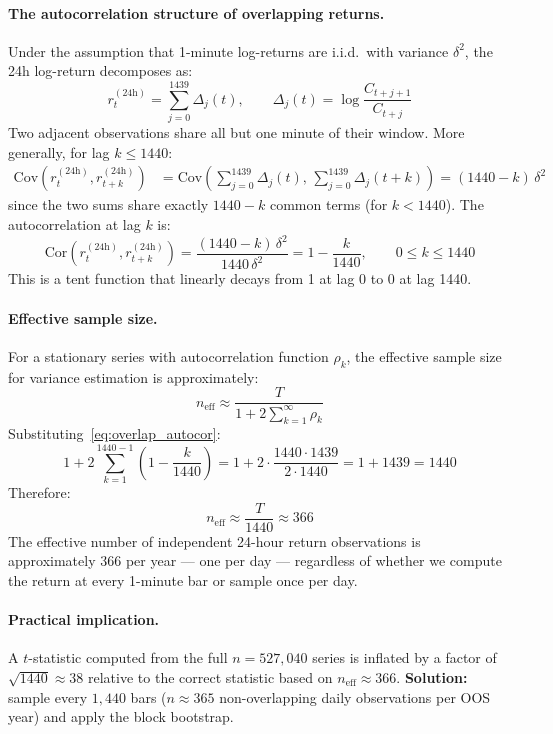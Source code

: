 \documentclass[12pt, a4paper]{article}
\theoremstyle{plain}
\theoremstyle{definition}
\newcommand{\Cov}{\mathrm{Cov}}
\newcommand{\Cor}{\mathrm{Cor}}
\begin{document}
\paragraph{The autocorrelation structure of overlapping returns.}
Under the assumption that 1-minute log-returns are i.i.d.\ with
variance $\delta^2$, the 24h log-return decomposes as:
\[
  r_t^{(24\text{h})} = \sum_{j=0}^{1439} \Delta_j(t),
  \qquad \Delta_j(t) = \log\frac{C_{t+j+1}}{C_{t+j}}
\]
Two adjacent observations share all but one minute of their window.
More generally, for lag $k \leq 1440$:
\begin{align*}
  \Cov\!\left(r_t^{(24\text{h})}, r_{t+k}^{(24\text{h})}\right)
  &= \Cov\!\left(\sum_{j=0}^{1439}\Delta_j(t),\,
                 \sum_{j=0}^{1439}\Delta_j(t+k)\right)
   = (1440 - k)\,\delta^2
\end{align*}
since the two sums share exactly $1440 - k$ common terms (for $k < 1440$).
The autocorrelation at lag $k$ is:
\begin{equation}
  \Cor\!\left(r_t^{(24\text{h})}, r_{t+k}^{(24\text{h})}\right)
  = \frac{(1440 - k)\,\delta^2}{1440\,\delta^2}
  = 1 - \frac{k}{1440}, \qquad 0 \leq k \leq 1440
  \label{eq:overlap_autocor}
\end{equation}
This is a tent function that linearly decays from 1 at lag 0 to 0 at lag 1440.

\paragraph{Effective sample size.}
For a stationary series with autocorrelation function $\rho_k$, the effective
sample size for variance estimation is approximately:
\[
  n_{\mathrm{eff}} \approx \frac{T}{1 + 2\sum_{k=1}^{\infty} \rho_k}
\]
Substituting~\eqref{eq:overlap_autocor}:
\[
  1 + 2\sum_{k=1}^{1440-1}\!\!\left(1 - \frac{k}{1440}\right)
  = 1 + 2 \cdot \frac{1440 \cdot 1439}{2 \cdot 1440}
  = 1 + 1439
  = 1440
\]
Therefore:
\begin{equation}
  n_{\mathrm{eff}} \approx \frac{T}{1440} \approx 366
  \label{eq:neff}
\end{equation}
The effective number of independent 24-hour return observations is
approximately 366 per year --- one per day --- regardless of whether we
compute the return at every 1-minute bar or sample once per day.

\paragraph{Practical implication.}
A $t$-statistic computed from the full $n = 527{,}040$ series is inflated
by a factor of $\sqrt{1440} \approx 38$ relative to the correct statistic
based on $n_{\mathrm{eff}} \approx 366$.  \textbf{Solution:} sample every
$1{,}440$ bars ($n \approx 365$ non-overlapping daily observations per OOS
year) and apply the block bootstrap.
\end{document}
